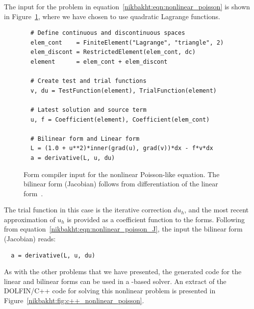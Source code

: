 The \ufl{} input for the problem in equation~\eqref{nikbakht:eqn:nonlinear_poisson}
is shown in Figure~\ref{nikbakht:fig:ufl_nonlinear_poisson}, where we have chosen to
use quadratic Lagrange functions.
%
\begin{figure}
\footnotesize
\begin{verbatim}
  # Define continuous and discontinuous spaces
  elem_cont    = FiniteElement("Lagrange", "triangle", 2)
  elem_discont = RestrictedElement(elem_cont, dc)
  element      = elem_cont + elem_discont

  # Create test and trial functions
  v, du = TestFunction(element), TrialFunction(element)

  # Latest solution and source term
  u, f = Coefficient(element), Coefficient(elem_cont)

  # Bilinear form and Linear form
  L = (1.0 + u**2)*inner(grad(u), grad(v))*dx - f*v*dx
  a = derivative(L, u, du)
\end{verbatim}
\caption{Form compiler input for the nonlinear Poisson-like equation. The bilinear
form (Jacobian) follows from differentiation of the linear form~.}
\label{nikbakht:fig:ufl_nonlinear_poisson}
\end{figure}
%
The trial function in this case is the iterative correction $du_{h}$,
and the most recent approximation of $u_{h}$ is provided as a coefficient
function to the forms.  Following from equation~\eqref{nikbakht:eqn:nonlinear_poisson_J},
the \ufl{} input the bilinear form (Jacobian) reads:
%
\begin{verbatim}
  a = derivative(L, u, du)
\end{verbatim}
%
As with the other problems that we have presented, the generated code for
the linear and bilinear forms can be used in a \dolfin{}-based solver.
An extract of the DOLFIN/C++ code for solving this nonlinear problem is
presented in Figure~\ref{nikbakht:fig:c++_nonlinear_poisson}.
%
